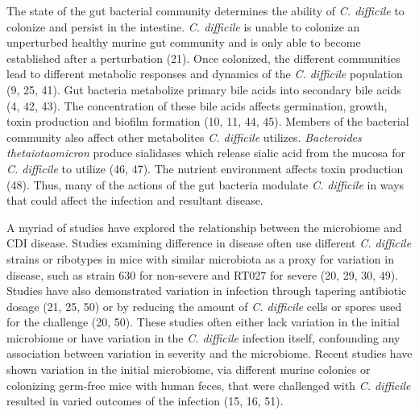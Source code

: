 \documentclass[
  12pt,
]{article}
\begin{document}
The state of the gut bacterial community determines the ability of
\emph{C. difficile} to colonize and persist in the intestine. \emph{C.
difficile} is unable to colonize an unperturbed healthy murine gut
community and is only able to become established after a perturbation
(21). Once colonized, the different communities lead to different
metabolic responses and dynamics of the \emph{C. difficile} population
(9, 25, 41). Gut bacteria metabolize primary bile acids into secondary
bile acids (4, 42, 43). The concentration of these bile acids affects
germination, growth, toxin production and biofilm formation (10, 11, 44,
45). Members of the bacterial community also affect other metabolites
\emph{C. difficile} utilizes. \emph{Bacteroides thetaiotaomicron}
produce sialidases which release sialic acid from the mucosa for
\emph{C. difficile} to utilize (46, 47). The nutrient environment
affects toxin production (48). Thus, many of the actions of the gut
bacteria modulate \emph{C. difficile} in ways that could affect the
infection and resultant disease.

A myriad of studies have explored the relationship between the
microbiome and CDI disease. Studies examining difference in disease
often use different \emph{C. difficile} strains or ribotypes in mice
with similar microbiota as a proxy for variation in disease, such as
strain 630 for non-severe and RT027 for severe (20, 29, 30, 49). Studies
have also demonstrated variation in infection through tapering
antibiotic dosage (21, 25, 50) or by reducing the amount of \emph{C.
difficile} cells or spores used for the challenge (20, 50). These
studies often either lack variation in the initial microbiome or have
variation in the \emph{C. difficile} infection itself, confounding any
association between variation in severity and the microbiome. Recent
studies have shown variation in the initial microbiome, via different
murine colonies or colonizing germ-free mice with human feces, that were
challenged with \emph{C. difficile} resulted in varied outcomes of the
infection (15, 16, 51).
\end{document}
